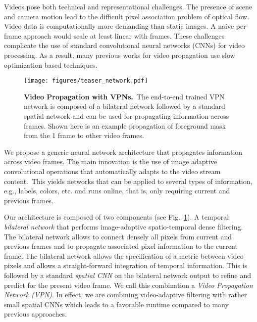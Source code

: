 \documentclass[10pt,twocolumn,letterpaper]{article}
\newcommand{\mycaption}[2]{\caption{\small \textbf{#1.}~#2}}
\begin{document}
Videos pose both technical and representational challenges.
The presence of scene and camera motion lead to the difficult pixel association problem of optical flow.
Video data is computationally more demanding than static images. A naive per-frame approach would scale at least linear with frames.
These challenges complicate the use of standard convolutional neural networks (CNNs) for video processing.
As a result, many previous works for video propagation use slow optimization based techniques.


\begin{figure}[t]
\begin{center}
\centerline{\texttt{[image: figures/teaser\_network.pdf]}}
  \mycaption{Video Propagation with VPNs} {The end-to-end trained VPN network is composed
  of a bilateral network followed by a standard spatial network and can be used for
  propagating information across frames. Shown here is an example propagation
  of foreground mask from the 1 frame to other video frames.}\label{fig:illustration}
\vspace{-0.5cm}
\end{center}
\vspace{-0.7cm}
\end{figure}

We propose a generic neural network architecture that propagates information across
video frames. The main innovation is the use of image adaptive convolutional operations that automatically
adapts to
the video stream content.~This yields networks that can be applied to several types of information, e.g., labels, colors, etc. and runs online, that is, only requiring current and previous frames.

Our architecture is composed of two components (see Fig.~\ref{fig:illustration}).
A temporal \textit{bilateral network} that performs image-adaptive spatio-temporal dense filtering.
The bilateral network allows to connect densely all pixels from current and previous frames and to propagate associated pixel information to the current frame.
The bilateral network allows the specification of a metric between video pixels and allows a straight-forward integration of temporal information.
This is followed by a standard \textit{spatial CNN} on the bilateral network output to refine and predict for the present video frame.
We call this combination a \textit{Video Propagation Network (VPN)}.
In effect, we are combining video-adaptive filtering with rather small spatial CNNs which
leads to a favorable runtime compared to many previous approaches.
\end{document}
